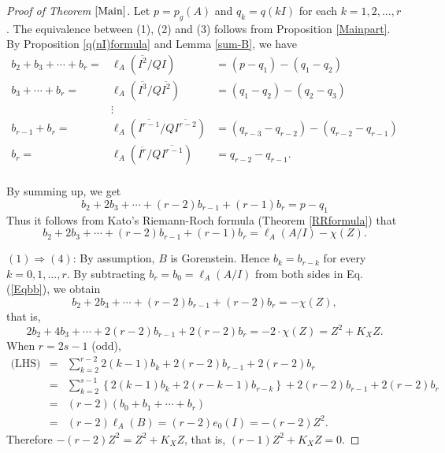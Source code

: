 \documentclass[12pt]{amsart}
\theoremstyle{definition}
\theoremstyle{remark}
\numberwithin{equation}{section}
\renewcommand{\:}{\colon}
\begin{document}
\begin{proof}[Proof of Theorem $\ref{Main}$]
 Let $p=p_g(A)$ and $q_k=q(kI)$ for each $k=1,2,\ldots,r$. 
The equivalence between (1), (2) and (3) follows from Proposition 
\ref{Mainpart}. 
By Proposition \ref{q(nI)formula} and Lemma \ref{sum-B}, we have 
\[
\begin{array}{rcl}
b_2+b_3+\cdots +b_r=& \!\!\!\! \ell_A(\overline{I^2}/QI)  \!\!&= 
(p-q_1) - (q_1-q_2) \\
b_3+\cdots +b_r=& \!\!\!\!  \ell_A(\overline{I^3}/Q\overline{I^{2}}) 
 \!\!&= (q_1-q_2) - (q_2-q_3) \\
  & \vdots & \\
b_{r-1}+b_r=& \!\!\!\!  \ell_A(\overline{I^{r-1}}/Q\overline{I^{r-2}})  
\!\!&= (q_{r-3}-q_{r-2}) - (q_{r-2}-q_{r-1}) \\
b_r=& \!\!\!\!  \ell_A(\overline{I^{r}}/Q\overline{I^{r-1}})  \!\!&= 
 q_{r-2}-q_{r-1}.  \\
\end{array}
\]
\par 
By summing up, we get 
\[
b_2+2b_3+\cdots +(r-2)b_{r-1}+(r-1)b_r=p-q_1 
\]
Thus it follows from Kato's Riemann-Roch formula (Theorem \ref{RRformula}) that 
\begin{equation} \label{Eqbb}
b_2+2b_3+\cdots+(r-2)b_{r-1}+(r-1)b_r = \ell_A(A/I)-\chi(Z). 
\end{equation}
\par \vspace{2mm} \par \noindent 
$(1) \Longrightarrow (4)$:
By assumption, $B$ is Gorenstein. Hence $b_k=b_{r-k}$ for 
every $k=0,1,\ldots, r$. 
By subtracting $b_r=b_0=\ell_A(A/I)$ from both sides 
in Eq. (\ref{Eqbb}), we obtain  
\[
b_2+2b_3+\cdots +(r-2)b_{r-1}+(r-2)b_r= -\chi(Z), 
\]
that is, 
\[
2b_2+4b_3+\cdots +2(r-2)b_{r-1}+2(r-2)b_r= -2 \cdot \chi(Z)=Z^2+K_XZ. 
\]
When $r=2s-1$ (odd), 
\begin{eqnarray*}
\text{(LHS)} &=& \sum_{k=2}^{r-2} 2(k-1)b_k + 2(r-2)b_{r-1}+2(r-2)b_r \\
&=& \sum_{k=2}^{s-1} \left\{2(k-1)b_k+2(r-k-1)b_{r-k} \right\}
+2(r-2)b_{r-1}+2(r-2)b_r \\
&=& (r-2)(b_0+b_1+\cdots+b_r) \\
&=& (r-2)\ell_A(B) =(r-2)e_0(I)=-(r-2)Z^2. 
\end{eqnarray*}
Therefore $-(r-2)Z^2=Z^2+K_XZ$, that is, $(r-1)Z^2 +K_XZ=0$. 
\par \vspace{2mm}

\end{proof}
\end{document}
